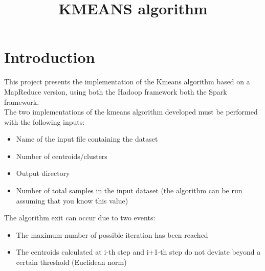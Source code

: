 \documentclass[a4paper, oneside]{article}
\begin{document}
\baselineskip 13pt

\begin{frontespizio} 
 \Preambolo{\renewcommand{\frontpretitlefont}{\fontsize{15}{12}\scshape}}
\Rientro {1cm}
 \Punteggiatura {}
\end{frontespizio}

\clearpage

\tableofcontents\thispagestyle{empty}
\clearpage

\title{KMEANS algorithm}

\section{Introduction}
This project presents the implementation of the Kmeans algorithm based on a MapReduce version, using both the Hadoop framework both the Spark framework.\\
The two implementations of the kmeans algorithm developed must be performed with the following inputs:
\begin{itemize}
\item Name of the input file containing the dataset
\item Number of centroids/clusters
\item Output directory
\item Number of total samples in the input dataset (the algorithm can be run assuming that you know this value)
\end{itemize}
\vspace{4mm}
The algorithm exit can occur due to two events:
\begin{itemize}
\item The maximum number of possible iteration has been reached 
\item The centroids calculated at i-th step and i+1-th step do not deviate beyond a certain threshold (Euclidean norm)
\end{itemize}
\end{document}
